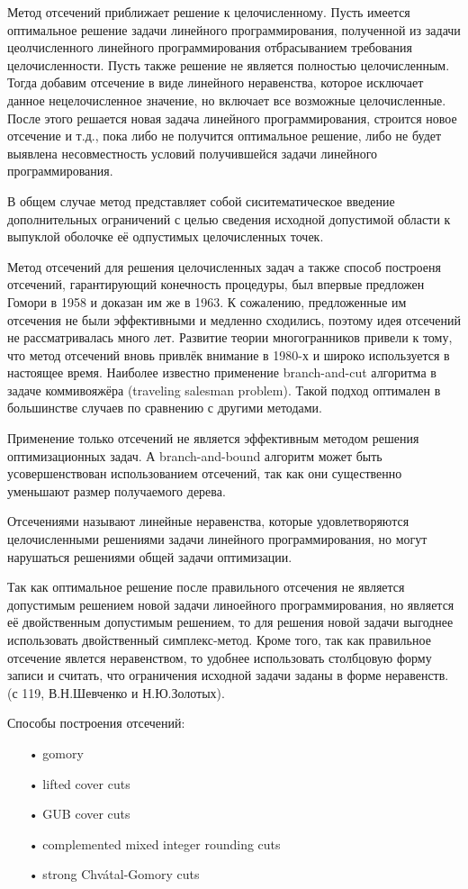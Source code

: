 \documentclass[a4paper,14pt,russian]{extreport}
\begin{document}
Метод отсечений приближает решение к целочисленному. Пусть имеется оптимальное решение задачи линейного программирования, полученной из задачи цеолчисленного линейного программирования отбрасыванием требования целочисленности. Пусть также решение не является полностью целочисленным. Тогда добавим отсечение в виде линейного неравенства, которое исключает данное нецелочисленное значение, но включает все возможные целочисленные. После этого решается новая задача линейного программирования, строится новое отсечение и т.д., пока либо не получится оптимальное решение, либо не будет выявлена несовместность условий получившейся задачи линейного программирования. 
\par 
В общем случае метод представляет собой сиситематическое введение дополнительных ограничений с целью сведения исходной допустимой области к выпуклой оболочке её одпустимых целочисленных точек.
\par
Метод отсечений для решения целочисленных задач а также способ построеня отсечений, гарантирующий конечность процедуры, был впервые предложен Гомори в 1958 \cite{gomory_1} и доказан им же в 1963\cite{gomory}. К сожалению, предложенные им отсечения не были эффективными и медленно сходились, поэтому идея отсечений не рассматривалась много лет. Развитие теории многогранников привели к тому, что метод отсечений вновь привлёк внимание в 1980-х и широко используется в настоящее время. Наиболее известно применение branch-and-cut алгоритма в задаче коммивояжёра (traveling salesman problem). Такой подход оптимален в большинстве случаев по сравнению с другими методами. 
\par
Применение только отсечений не является эффективным методом решения оптимизационных задач. А branch-and-bound алгоритм может быть усовершенствован использованием отсечений, так как они существенно уменьшают размер получаемого дерева.
\par
Отсечениями называют линейные неравенства, которые удовлетворяются целочисленными решениями задачи линейного программирования, но могут нарушаться решениями общей задачи оптимизации.
\par
Так как оптимальное решение после правильного отсечения не является допустимым решением новой задачи линоейного программирования, но является её двойственным допустимым решением, то для решения новой задачи выгоднее использовать двойственный симплекс-метод. Кроме того, так как правильное отсечение явлется неравенством, то удобнее использовать столбцовую форму записи и считать, что ограничения исходной задачи заданы в форме неравенств. (с 119, В.Н.Шевченко и Н.Ю.Золотых).
\par
Способы построения отсечений:
\begin{itemize}
\item[•] gomory \cite{gomory}
\item[•] lifted cover cuts \cite{balas}\cite{balas_zemel}\cite{martin_weismantel}
\item[•] GUB cover cuts \cite{wolsey}
\item[•] complemented mixed integer rounding cuts \cite{marchand_wolsey}
\item[•] strong Chvátal-Gomory cuts \cite{letchford_lodi}
\end{itemize}
\par
\end{document}
